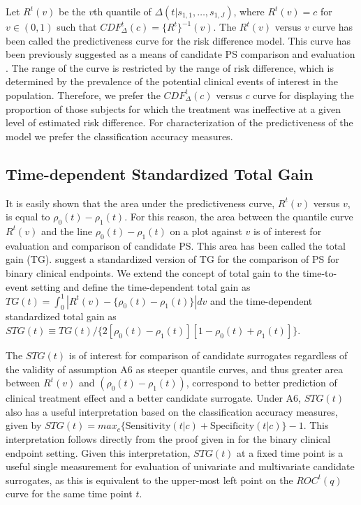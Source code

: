 \documentclass[times, doublespace]{simauth}
\begin{document}
Let $R^t(v)$ be the $v$th quantile of $\Delta(t|s_{1,1}, \dots, s_{1,J})$, where $R^t(v)=c$ for $v\in(0,1)$ such that $CDF^{t}_{\Delta}(c)=\{R^t\}^{-1}(v)$. The $R^t(v)$ versus $v$ curve has been called the predictiveness curve for the risk difference model. This curve has been previously suggested as a means of candidate PS comparison and evaluation \citep{Gilbert08}. The range of the curve is restricted by the range of risk difference, which is determined by the prevalence of the potential clinical events of interest in the population. Therefore, we prefer the $CDF^{t}_{\Delta}(c)$ versus $c$ curve for displaying the proportion of those subjects for which the treatment was ineffective at a given level of estimated risk difference. For characterization of the predictiveness of the model we prefer the classification accuracy measures.

\subsection{Time-dependent Standardized Total Gain} \label{STG}
It is easily shown that the area under the predictiveness curve, $R^t(v)$ versus $v$, is equal to $\rho_0(t)-\rho_1(t)$. For this reason, the area between the quantile curve $R^t(v)$ and the line $\rho_0(t)-\rho_1(t)$ on a plot against $v$ is of interest for evaluation and comparison of candidate PS. This area has been called the total gain (TG). \citet{Huang11} suggest a standardized version of TG for the comparison of PS for binary clinical endpoints. We extend the concept of total gain to the time-to-event setting and define the time-dependent total gain as $TG(t) = \int_0^{1}{|R^t(v) -\{\rho_0(t) -\rho_1(t)\}|dv}$ and the time-dependent standardized total gain as $STG(t) \equiv TG(t)/\{2[\rho_0(t) - \rho_1(t)][1-\rho_0(t) + \rho_1(t)]\}$.

The $STG(t)$ is of interest for comparison of candidate surrogates regardless of the validity of assumption A6 as steeper quantile curves, and thus greater area between $R^t(v)$ and $(\rho_0(t) -\rho_1(t))$, correspond to better prediction of clinical treatment effect and a better candidate surrogate. Under A6, $STG(t)$ also has a useful interpretation based on the classification accuracy measures, given by $STG(t)=max_c\{\mbox{Sensitivity}(t|c) + \mbox{Specificity}(t|c)\} -1$. This interpretation follows directly from the proof given in \citet{Huang11} for the binary clinical endpoint setting. Given this interpretation, $STG(t)$ at a fixed time point is a useful single measurement for evaluation of univariate and multivariate candidate surrogates, as this is equivalent to the upper-most left point on the $ROC^{t}(q)$ curve for the same time point $t$.
\end{document}
